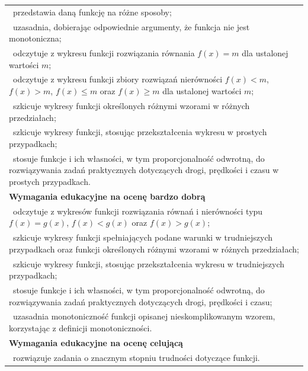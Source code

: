 \documentclass[12pt,a4paper]{article}
\begin{document}
\begin{longtable}{|p{16cm}|}
		\textbullet\ przedstawia daną funkcję na różne sposoby; \\
		
		\textbullet\ uzasadnia, dobierając odpowiednie argumenty, że funkcja nie jest monotoniczna; \\
		
		\textbullet\ odczytuje z wykresu funkcji rozwiązania równania $f(x)=m$ dla ustalonej wartości $m$; \\
		
		\textbullet\ odczytuje z wykresu funkcji zbiory rozwiązań nierówności $f(x)<m$, $f(x)>m$, $f(x)\leq m$ oraz $f(x)\geq m$ dla ustalonej wartości $m$; \\
		
		\textbullet\ szkicuje wykresy funkcji określonych różnymi wzorami w różnych przedziałach; \\
		
		\textbullet\ szkicuje wykresy funkcji, stosując przekształcenia wykresu w prostych przypadkach; \\
		
		\textbullet\ stosuje funkcje i ich własności, w tym proporcjonalność odwrotną, do rozwiązywania zadań praktycznych dotyczących drogi, prędkości i czasu w prostych przypadkach. \\ \hline
		
		\textbf{Wymagania edukacyjne na ocenę bardzo dobrą} \\ \hline
		
		\textbullet\ odczytuje z wykresów funkcji rozwiązania równań i nierówności typu $f(x)=g(x)$, $f(x)<g(x)$ oraz $f(x)>g(x)$; \\
		
		\textbullet\ szkicuje wykresy funkcji spełniających podane warunki w trudniejszych przypadkach oraz funkcji określonych różnymi wzorami w różnych przedziałach; \\
		
		\textbullet\ szkicuje wykresy funkcji, stosując przekształcenia wykresu w trudniejszych przypadkach; \\
		
		\textbullet\ stosuje funkcje i ich własności, w tym proporcjonalność odwrotną, do rozwiązywania zadań praktycznych dotyczących drogi, prędkości i czasu; \\
		
		\textbullet\ uzasadnia monotoniczność funkcji opisanej nieskomplikowanym wzorem, korzystając z definicji monotoniczności. \\ \hline
		
		\textbf{Wymagania edukacyjne na ocenę celującą} \\ \hline
		
		\textbullet\ rozwiązuje zadania o znacznym stopniu trudności dotyczące funkcji. \\ \hline
		
	\end{longtable}
	
\end{document}
